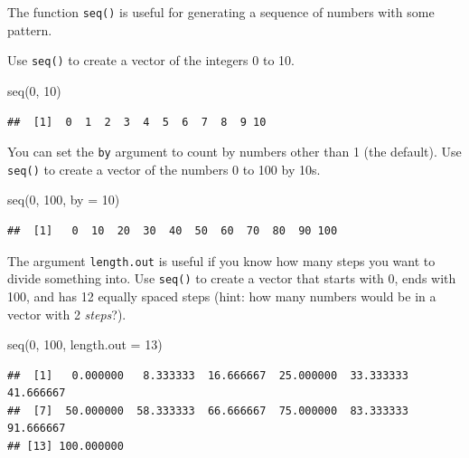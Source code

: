 \documentclass[
  oneside]{book}
\newenvironment{Shaded}{\begin{snugshade}}{\end{snugshade}}
\newcommand{\AttributeTok}[1]{\textcolor[rgb]{0.77,0.63,0.00}{#1}}
\newcommand{\DecValTok}[1]{\textcolor[rgb]{0.00,0.00,0.81}{#1}}
\newcommand{\FunctionTok}[1]{\textcolor[rgb]{0.00,0.00,0.00}{#1}}
\newcommand{\NormalTok}[1]{#1}
\begin{document}
The function \texttt{seq()} is useful for generating a sequence of numbers with some pattern.

Use \texttt{seq()} to create a vector of the integers 0 to 10.

\begin{Shaded}
\begin{Highlighting}[]
\FunctionTok{seq}\NormalTok{(}\DecValTok{0}\NormalTok{, }\DecValTok{10}\NormalTok{)}
\end{Highlighting}
\end{Shaded}

\begin{verbatim}
##  [1]  0  1  2  3  4  5  6  7  8  9 10
\end{verbatim}

You can set the \texttt{by} argument to count by numbers other than 1 (the default). Use \texttt{seq()} to create a vector of the numbers 0 to 100 by 10s.

\begin{Shaded}
\begin{Highlighting}[]
\FunctionTok{seq}\NormalTok{(}\DecValTok{0}\NormalTok{, }\DecValTok{100}\NormalTok{, }\AttributeTok{by =} \DecValTok{10}\NormalTok{)}
\end{Highlighting}
\end{Shaded}

\begin{verbatim}
##  [1]   0  10  20  30  40  50  60  70  80  90 100
\end{verbatim}

The argument \texttt{length.out} is useful if you know how many steps you want to divide something into. Use \texttt{seq()} to create a vector that starts with 0, ends with 100, and has 12 equally spaced steps (hint: how many numbers would be in a vector with 2 \emph{steps}?).

\begin{Shaded}
\begin{Highlighting}[]
\FunctionTok{seq}\NormalTok{(}\DecValTok{0}\NormalTok{, }\DecValTok{100}\NormalTok{, }\AttributeTok{length.out =} \DecValTok{13}\NormalTok{)}
\end{Highlighting}
\end{Shaded}

\begin{verbatim}
##  [1]   0.000000   8.333333  16.666667  25.000000  33.333333  41.666667
##  [7]  50.000000  58.333333  66.666667  75.000000  83.333333  91.666667
## [13] 100.000000
\end{verbatim}
\end{document}

